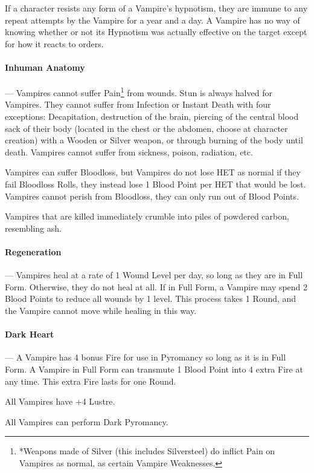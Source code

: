 \documentclass[oneside,11pt,english]{book}
\begin{document}
If a character resists any form of a Vampire's hypnotism, they are immune to any repeat 
attempts by the Vampire for a year and a day. A Vampire has no way of knowing whether or not 
its Hypnotism was actually effective on the target except for how it reacts to orders. 

\paragraph{Inhuman Anatomy}---\quad
Vampires cannot suffer Pain\footnote{*Weapons made of Silver (this includes Silversteel) do inflict Pain on Vampires as normal, as certain Vampire Weaknesses.} from wounds. Stun is always halved for Vampires. They cannot 
suffer from Infection or Instant Death with four exceptions: Decapitation, destruction of the brain, 
piercing of the central blood sack of their body (located in the chest or the abdomen, choose at 
character creation) with a Wooden or Silver weapon, or through burning of the body until death. 
Vampires cannot suffer from sickness, poison, radiation, etc. 

Vampires can suffer Bloodloss, but Vampires do not lose HET as normal if they fail Bloodloss 
Rolls, they instead lose 1 Blood Point per HET that would be lost. Vampires cannot perish from 
Bloodloss, they can only run out of Blood Points. 

Vampires that are killed immediately crumble into piles of powdered carbon, resembling ash. 

\paragraph{Regeneration}---\quad
Vampires heal at a rate of 1 Wound Level per day, so long as they are in Full Form. Otherwise, 
they do not heal at all. 
If in Full Form, a Vampire may spend 2 Blood Points to reduce all wounds by 1 level. This 
process takes 1 Round, and the Vampire cannot move while healing in this way. 

\paragraph{Dark Heart}---\quad
A Vampire has 4 bonus Fire for use in Pyromancy so long as it is in Full Form. 
A Vampire in Full Form can transmute 1 Blood Point into 4 extra Fire at any time. This extra Fire 
lasts for one Round. 

All Vampires have +4 Lustre. 

All Vampires can perform Dark Pyromancy. 
\end{document}

